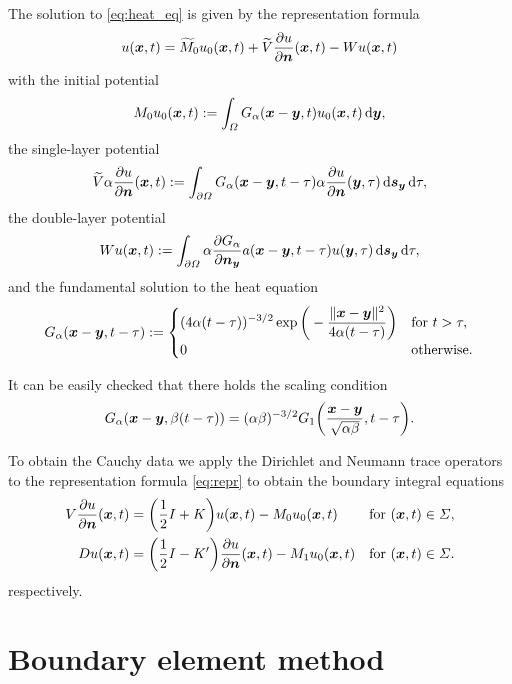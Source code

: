 \documentclass[a4paper,11pt]{article}
\begin{document}
The solution to \eqref{eq:heat_eq} is given by the representation formula
\begin{equation}
  \label{eq:repr}
  u({{\bm{x}}},t) = \widetilde M_0 u_0({{\bm{x}}},t) + \widetilde V \frac{\partial u}{\partial {\ensuremath{{\bm{n}}}}}({{\bm{x}}},t) - Wu({{\bm{x}}},t)
\end{equation}
with the initial potential
\begin{equation*}
  M_0 u_0({{\bm{x}}},t) := \int_\Omega G_\alpha({{\bm{x}}}-{{\bm{y}}},t) u_0({{\bm{x}}},t) \,{\mathrm{d}}{{\bm{y}}},
\end{equation*}
the single-layer potential 
\begin{equation*}
  \widetilde V \alpha\frac{\partial u}{\partial {\ensuremath{{\bm{n}}}}} ({{\bm{x}}},t) := \int_{\partial\Omega} G_\alpha({{\bm{x}}}-{{\bm{y}}},t-\tau) \alpha\frac{\partial u}{\partial {\ensuremath{{\bm{n}}}}} ({{\bm{y}}},\tau) \,{\mathrm{d}}{{\bm{s}}}_{{\bm{y}}} \,{\mathrm{d}}\tau,
\end{equation*}
the double-layer potential
\begin{equation*}
  W u ({{\bm{x}}},t) := \int_{\partial\Omega} \alpha\frac{\partial G_\alpha}{\partial {\ensuremath{{\bm{n}}}}_{{\bm{y}}}}a({{\bm{x}}}-{{\bm{y}}},t-\tau) u({{\bm{y}}},\tau) \,{\mathrm{d}}{{\bm{s}}}_{{\bm{y}}} \,{\mathrm{d}}\tau,
\end{equation*}
and the fundamental solution to the heat equation
\begin{equation*}
  G_\alpha({{\bm{x}}}-{{\bm{y}}},t-\tau) :=
  \begin{cases}
  \displaystyle
  (4\alpha(t-\tau))^{-3/2}\exp\bigg( -\frac{\|{{\bm{x}}}-{{\bm{y}}}\|^2}{4\alpha(t-\tau)} \bigg) & \text{for } t > \tau, \\
  0 & \text{otherwise.}
  \end{cases}
\end{equation*}

\begin{remark}
  It can be easily checked that there holds the scaling condition
  \begin{equation*}
    G_\alpha({{\bm{x}}}-{{\bm{y}}},\beta(t-\tau)) = (\alpha\beta)^{-3/2} G_1\bigg( \frac{{{\bm{x}}}-{{\bm{y}}}}{\sqrt{\alpha\beta}}, t-\tau \bigg).
  \end{equation*}
\end{remark}

To obtain the Cauchy data we apply the Dirichlet and Neumann trace operators to the representation formula \eqref{eq:repr} to obtain the boundary integral equations
\begin{align*}
  V\frac{\partial u}{\partial {\ensuremath{{\bm{n}}}}}({{\bm{x}}},t) &= \bigg(\frac{1}{2} I + K \bigg) u({{\bm{x}}},t) - M_0 u_0({{\bm{x}}},t) &&\text{for } ({{\bm{x}}},t) \in \Sigma, \\
  Du({{\bm{x}}},t) &= \bigg(\frac{1}{2} I - K' \bigg) \frac{\partial u}{\partial {\ensuremath{{\bm{n}}}}}({{\bm{x}}},t) - M_1 u_0({{\bm{x}}},t) &&\text{for } ({{\bm{x}}},t) \in \Sigma.
\end{align*}
respectively. 

\section{Boundary element method}


\newpage


\end{document}
